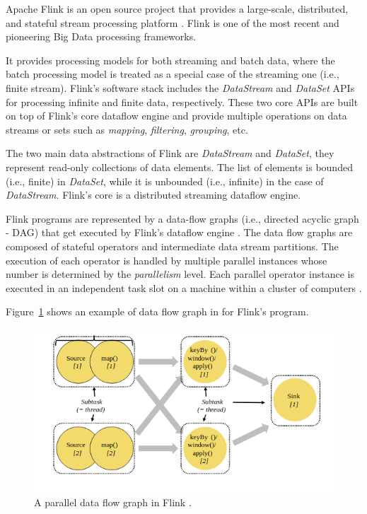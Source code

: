 \par Apache Flink is an open source project that provides a large-scale, distributed, and stateful stream processing platform \cite{carbone2015apache}. Flink is one of the most recent and pioneering Big Data processing frameworks.

\par  It provides processing models for both streaming and batch data, where the batch processing model is treated as a special case of the streaming one (i.e., finite stream). Flink's software stack includes the \textit{DataStream} and \textit{DataSet} APIs for processing infinite and finite data, respectively. These two core APIs are built on top of Flink's core dataflow engine and provide multiple operations on data streams or sets such as \textit{mapping}, \textit{filtering}, \textit{grouping}, etc.

\par The two main data abstractions of Flink are \textit{DataStream} and \textit{DataSet},  they represent read-only collections of data elements. The list of elements is bounded (i.e., finite) in \textit{DataSet}, while it is unbounded (i.e., infinite) in the case of \textit{DataStream}. Flink's core is a distributed streaming dataflow engine. 


\par Flink programs are represented by a data-flow graphs (i.e., directed acyclic graph - DAG) that get executed by Flink's dataflow engine \cite{carbone2015apache}. The data flow graphs are composed of stateful operators and intermediate data stream partitions.  The execution of each operator is handled by multiple parallel instances whose number is determined by the \textit{parallelism} level. Each parallel operator instance is executed in an independent task slot on a machine within a cluster of computers \cite{Flink}.
\par  Figure~\ref{fig:flink} shows an example of data flow graph in for Flink's program.

\begin{figure}[H]
	\centering
	\includegraphics[width=\linewidth]{chapters/figures/flink_program.png}
	
	\caption{A parallel data flow graph in Flink \cite{Flink}.}
	\label{fig:flink}
\end{figure}
    

